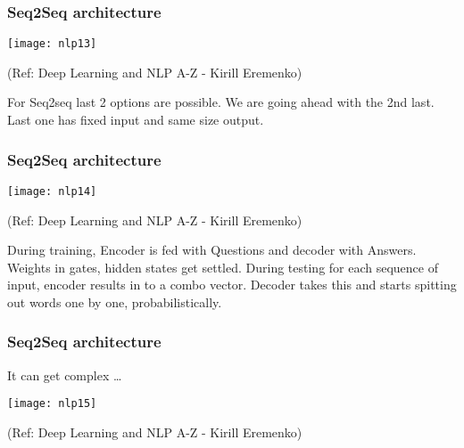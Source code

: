 \begin{frame}[fragile]\frametitle{Seq2Seq architecture}

\begin{center}
\texttt{[image: nlp13]}

\tiny{(Ref: Deep Learning and NLP A-Z - Kirill Eremenko)}
\end{center}

For Seq2seq last 2 options are possible. We are going ahead with the 2nd last. Last one has fixed input and same size output.

\end{frame}

\begin{frame}[fragile]\frametitle{Seq2Seq architecture}

\begin{center}
\texttt{[image: nlp14]}

\tiny{(Ref: Deep Learning and NLP A-Z - Kirill Eremenko)}
\end{center}
During training, Encoder is fed with Questions and decoder with Answers. Weights in gates, hidden states get settled. During testing for each sequence of input, encoder results in to a combo vector. Decoder takes this and starts spitting out words one by  one, probabilistically.

\end{frame}

\begin{frame}[fragile]\frametitle{Seq2Seq architecture}
It can get complex \ldots
\begin{center}
\texttt{[image: nlp15]}

\tiny{(Ref: Deep Learning and NLP A-Z - Kirill Eremenko)}
\end{center}

\end{frame}

